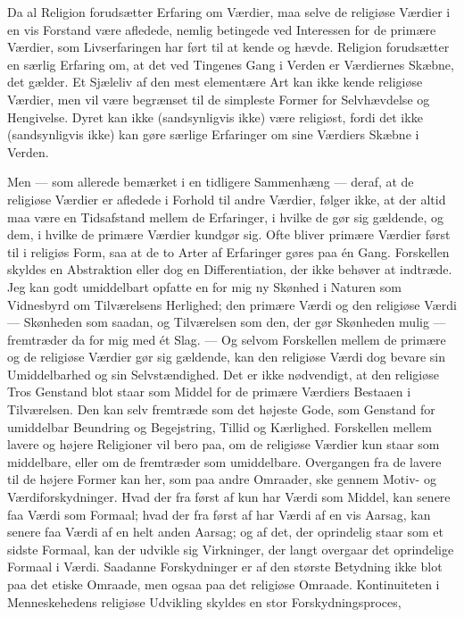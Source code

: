 \documentclass[12pt,a4paper,openany]{book}
\newcommand{\opage}[1]{\marginnote{\footnotesize\textit{[#1]}}}
\begin{document}
Da al Religion forudsætter Erfaring om Værdier, maa selve de religiøse
Værdier i en vis Forstand være afledede, nemlig betingede ved Interessen
for de primære Værdier, som Livserfaringen har ført til at kende og
hævde. Religion forudsætter en særlig Erfaring om, at det ved Tingenes
Gang i Verden er Værdiernes Skæbne, det gælder. Et Sjæleliv af den mest
elementære Art kan ikke kende religiøse Værdier, men vil være begrænset
til de simpleste Former for Selvhævdelse og Hengivelse. Dyret kan ikke
(sandsynligvis ikke) være religiøst, fordi det ikke (sandsynligvis ikke)
kan gøre særlige Erfaringer om sine Værdiers Skæbne i Verden.

Men --- som allerede bemærket i en tidligere Sammenhæng ---
\opage{148}deraf, at de religiøse Værdier er afledede i Forhold til
andre Værdier, følger ikke, at der altid maa være en Tidsafstand mellem
de Erfaringer, i hvilke de gør sig gældende, og dem, i hvilke de primære
Værdier kundgør sig. Ofte bliver primære Værdier først til i religiøs
Form, saa at de to Arter af Erfaringer gøres paa én Gang. Forskellen
skyldes en Abstraktion eller dog en Differentiation, der ikke behøver at
indtræde. Jeg kan godt umiddelbart opfatte en for mig ny Skønhed i
Naturen som Vidnesbyrd om Tilværelsens Herlighed; den primære Værdi og
den religiøse Værdi --- Skønheden som saadan, og Tilværelsen som den,
der gør Skønheden mulig --- fremtræder da for mig med ét Slag. --- Og
selvom Forskellen mellem de primære og de religiøse Værdier gør sig
gældende, kan den religiøse Værdi dog bevare sin Umiddelbarhed og sin
Selvstændighed. Det er ikke nødvendigt, at den religiøse Tros Genstand
blot staar som Middel for de primære Værdiers Bestaaen i Tilværelsen.
Den kan selv fremtræde som det højeste Gode, som Genstand for umiddelbar
Beundring og Begejstring, Tillid og Kærlighed. Forskellen mellem lavere
og højere Religioner vil bero paa, om de religiøse Værdier kun staar som
middelbare, eller om de fremtræder som umiddelbare. Overgangen fra de
lavere til de højere Former kan her, som paa andre Omraader, ske gennem
Motiv- og Værdiforskydninger. Hvad der fra først af kun har Værdi som
Middel, kan senere faa Værdi som Formaal; hvad der fra først af har
Værdi af en vis Aarsag, kan senere faa Værdi af en helt anden Aarsag; og
af det, der oprindelig staar som et sidste Formaal, kan der udvikle sig
Virkninger, der langt overgaar det oprindelige Formaal i Værdi. Saadanne
Forskydninger er af den største Betydning ikke blot paa det etiske
Omraade, men ogsaa paa det religiøse Omraade. Kontinuiteten i
Menneskehedens religiøse Udvikling skyldes en stor Forskydningsproces,
\end{document}
